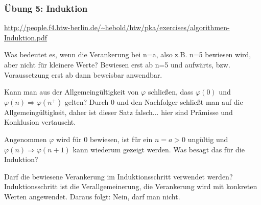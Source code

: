 \begin{card}
	\frametitle{Übung 5: Induktion}
	\url{http://people.f4.htw-berlin.de/~hebold/htw/pka/exercises/algorithmen-Induktion.pdf}
\end{card}

\begin{card}
	Was bedeutet es, wenn die Verankerung bei n=a, also z.B. n=5 bewiesen wird, aber nicht für kleinere Werte?
	\hr
	Bewiesen erst ab n=5 und aufwärts, bzw. Voraussetzung erst ab dann beweisbar anwendbar.
\end{card}

\begin{card}
	Kann man aus der Allgemeingültigkeit von $\varphi$ schließen, dass $\varphi (0)$ und $\varphi (n)\Rightarrow \varphi (n^+)$ gelten?
	\hr
	Durch 0 und den Nachfolger schließt man auf die Allgemeingültigkeit, daher ist dieser Satz falsch... hier sind Prämisse und Konklusion vertauscht.
\end{card}

\begin{card}
	Angenommen $\varphi$ wird für 0 bewiesen, ist für ein $n= a > 0$ ungültig und $\varphi(n) \Rightarrow \varphi(n+1)$ kann wiederum gezeigt werden. Was besagt das für die Induktion? 
	\hr
	
\end{card}

\begin{card}
	Darf die bewiesene Verankerung im Induktionsschritt verwendet werden?
	\hr
	Induktionsschritt ist die Verallgemeinerung, die Verankerung wird mit konkreten Werten angewendet. Daraus folgt: Nein, darf man nicht.
\end{card}

